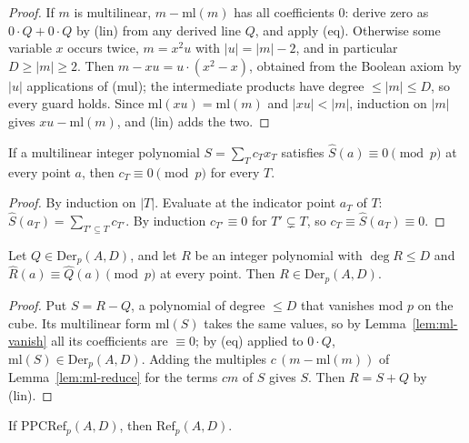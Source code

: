 \begin{proof}
If $m$ is multilinear, $m-\mathrm{ml}(m)$ has all coefficients $0$: derive zero as
$0\cdot Q+0\cdot Q$ by (lin) from any derived line $Q$, and apply (eq).  Otherwise some variable $x$ occurs twice, $m=x^2u$ with
$|u|=|m|-2$, and in particular $D\ge|m|\ge2$.  Then $m-xu=u\cdot(x^2-x)$, obtained from the
Boolean axiom by $|u|$ applications of (mul); the intermediate products have degree
$\le|m|\le D$, so every guard holds.  Since $\mathrm{ml}(xu)=\mathrm{ml}(m)$ and $|xu|<|m|$,
induction on $|m|$ gives $xu-\mathrm{ml}(m)$, and (lin) adds the two.
\end{proof}

\begin{lemma}\label{lem:ml-vanish}
If a multilinear integer polynomial $S=\sum_T c_Tx_T$ satisfies $\hat S(a)\equiv0\pmod p$
at every point $a$, then $c_T\equiv0\pmod p$ for every $T$.
\end{lemma}

\begin{proof}
By induction on $|T|$.  Evaluate at the indicator point $a_T$ of $T$:
$\hat S(a_T)=\sum_{T'\subseteq T}c_{T'}$.  By induction $c_{T'}\equiv0$ for $T'\subsetneq T$,
so $c_T\equiv\hat S(a_T)\equiv0$.
\end{proof}

\begin{lemma}\label{lem:der-of-cube}
Let $Q\in\mathrm{Der}_p(A,D)$, and let $R$ be an integer polynomial with $\deg R\le D$ and
$\hat R(a)\equiv\hat Q(a)\pmod p$ at every point.  Then $R\in\mathrm{Der}_p(A,D)$.
\end{lemma}

\begin{proof}
Put $S=R-Q$, a polynomial of degree $\le D$ that vanishes mod $p$ on the cube.  Its
multilinear form $\mathrm{ml}(S)$ takes the same values, so by
Lemma~\ref{lem:ml-vanish} all its coefficients are $\equiv0$; by (eq) applied to $0\cdot Q$,
$\mathrm{ml}(S)\in\mathrm{Der}_p(A,D)$.  Adding the multiples $c\,(m-\mathrm{ml}(m))$ of
Lemma~\ref{lem:ml-reduce} for the terms $cm$ of $S$ gives $S$.  Then $R=S+Q$ by (lin).
\end{proof}

\begin{proposition}\label{prop:sem-to-std}
If $\mathrm{PPCRef}_p(A,D)$, then $\mathrm{Ref}_p(A,D)$.
\end{proposition}

